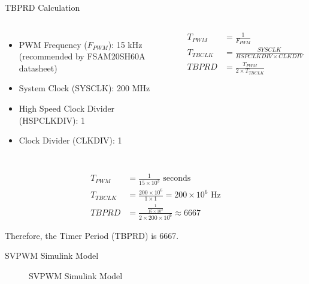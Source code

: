 \begin{frame}{TBPRD Calculation}

	\begin{columns}[T]
		\begin{itemize}
			\item PWM Frequency ($F_{PWM}$): 15 kHz (recommended by FSAM20SH60A datasheet)
			\item System Clock (SYSCLK): 200 MHz
			\item High Speed Clock Divider (HSPCLKDIV): 1
			\item Clock Divider (CLKDIV): 1
		\end{itemize}
		\begin{align*}
			T_{PWM}   & = \frac{1}{F_{PWM}}                      \\
			T_{TBCLK} & = \frac{SYSCLK}{HSPCLKDIV \times CLKDIV} \\
			TBPRD     & = \frac{T_{PWM}}{2 \times T_{TBCLK}}
		\end{align*}
	\end{columns}

	\vspace{0.5cm}

	\begin{align*}
		T_{PWM}   & = \frac{1}{15 \times 10^3} \text{ seconds}                               \\
		T_{TBCLK} & = \frac{200 \times 10^6}{1 \times 1} = 200 \times 10^6 \text{ Hz}        \\
		TBPRD     & = \frac{\frac{1}{15 \times 10^3}}{2 \times 200 \times 10^6} \approx 6667
	\end{align*}

	\tiny{Therefore, the Timer Period (TBPRD) is 6667.}
\end{frame}



\begin{frame}{SVPWM Simulink Model}
	\begin{figure}
		\centering
		\caption{SVPWM Simulink Model}
	\end{figure}
\end{frame}


